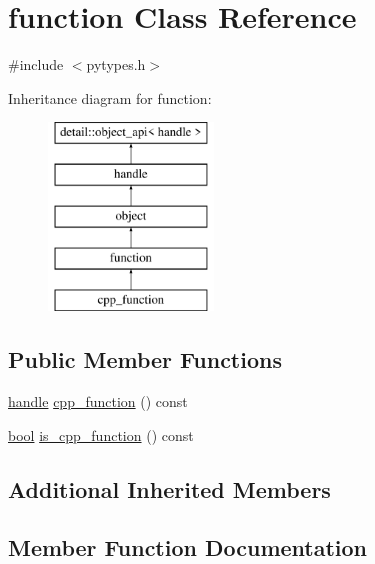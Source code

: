 \hypertarget{classfunction}{}\section{function Class Reference}
\label{classfunction}


{\ttfamily \#include $<$pytypes.\+h$>$}

Inheritance diagram for function\+:\begin{figure}[H]
\begin{center}
\leavevmode
\includegraphics[height=5.000000cm]{classfunction}
\end{center}
\end{figure}
\subsection*{Public Member Functions}
\begin{DoxyCompactItemize}
\item 
\mbox{\hyperlink{classhandle}{handle}} \mbox{\hyperlink{classfunction_a05dae3c06b8b416ac4a508f72fdbc841}{cpp\+\_\+function}} () const
\item 
\mbox{\hyperlink{asdl_8h_af6a258d8f3ee5206d682d799316314b1}{bool}} \mbox{\hyperlink{classfunction_accf0840a607c586ac159024928b98c49}{is\+\_\+cpp\+\_\+function}} () const
\end{DoxyCompactItemize}
\subsection*{Additional Inherited Members}


\subsection{Member Function Documentation}
\mbox{\label{classfunction_a05dae3c06b8b416ac4a508f72fdbc841}} 
